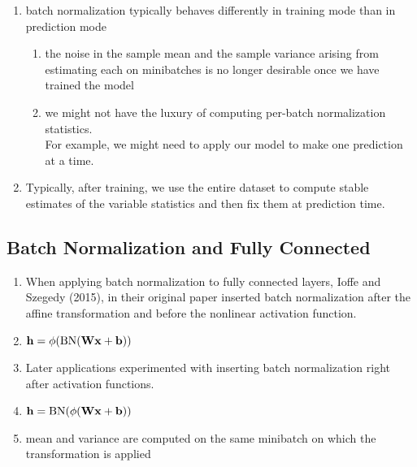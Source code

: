 \begin{enumerate}[itemsep=0.1cm]
    \item batch normalization typically behaves differently in training mode than in prediction mode
    \begin{enumerate}
        \item the noise in the sample mean and the sample variance arising from estimating each on minibatches is no longer desirable once we have trained the model

        \item we might not have the luxury of computing per-batch normalization statistics. \\
        For example, we might need to apply our model to make one prediction at a time.

    \end{enumerate}

    \item Typically, after training, we use the entire dataset to compute stable estimates of the variable statistics and then fix them at prediction time.

\end{enumerate}


\subsection{Batch Normalization and Fully Connected \cite{dnn-1}}

\begin{enumerate}[itemsep=0.2cm]
    \item When applying batch normalization to fully connected layers, Ioffe and Szegedy (2015), in their original paper inserted batch normalization after the affine transformation and before the nonlinear activation function. 

    \item[] 
    $
        \hfill
        \mathbf{h} = \phi(\textrm{BN}(\mathbf{W}\mathbf{x} + \mathbf{b}) )
        \hfill
    $
    
    \item Later applications experimented with inserting batch normalization right after activation functions.
    
    \item[] $
        \hfill
        \mathbf{h} = \textrm{BN}(\phi(\mathbf{W}\mathbf{x} + \mathbf{b}) )
        \hfill
    $

    \item mean and variance are computed on the same minibatch on which the transformation is applied
\end{enumerate}


